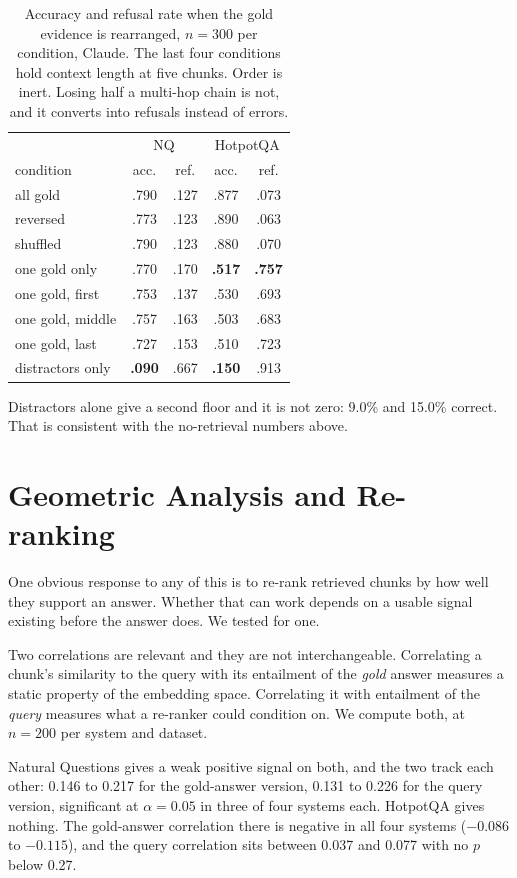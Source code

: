 \documentclass[11pt]{article}
\begin{document}
\begin{table}[t]
\centering\small
\begin{tabular}{lcccc}
\hline
 & \multicolumn{2}{c}{NQ} & \multicolumn{2}{c}{HotpotQA} \\
condition & acc. & ref. & acc. & ref. \\
\hline
all gold & .790 & .127 & .877 & .073 \\
reversed & .773 & .123 & .890 & .063 \\
shuffled & .790 & .123 & .880 & .070 \\
one gold only & .770 & .170 & \textbf{.517} & \textbf{.757} \\
one gold, first & .753 & .137 & .530 & .693 \\
one gold, middle & .757 & .163 & .503 & .683 \\
one gold, last & .727 & .153 & .510 & .723 \\
distractors only & \textbf{.090} & .667 & \textbf{.150} & .913 \\
\hline
\end{tabular}
\caption{Accuracy and refusal rate when the gold evidence is rearranged, $n = 300$ per condition, Claude. The last four conditions hold context length at five chunks. Order is inert. Losing half a multi-hop chain is not, and it converts into refusals instead of errors.}
\label{tab:ablation}
\end{table}

Distractors alone give a second floor and it is not zero: 9.0\% and 15.0\% correct. That is consistent with the no-retrieval numbers above.


\section{Geometric Analysis and Re-ranking}
\label{sec:esa}

One obvious response to any of this is to re-rank retrieved chunks by how well they support an answer. Whether that can work depends on a usable signal existing before the answer does. We tested for one.

Two correlations are relevant and they are not interchangeable. Correlating a chunk's similarity to the query with its entailment of the \emph{gold} answer measures a static property of the embedding space. Correlating it with entailment of the \emph{query} measures what a re-ranker could condition on. We compute both, at $n = 200$ per system and dataset.

Natural Questions gives a weak positive signal on both, and the two track each other: 0.146 to 0.217 for the gold-answer version, 0.131 to 0.226 for the query version, significant at $\alpha = 0.05$ in three of four systems each. HotpotQA gives nothing. The gold-answer correlation there is negative in all four systems ($-0.086$ to $-0.115$), and the query correlation sits between 0.037 and 0.077 with no $p$ below 0.27.
\end{document}
